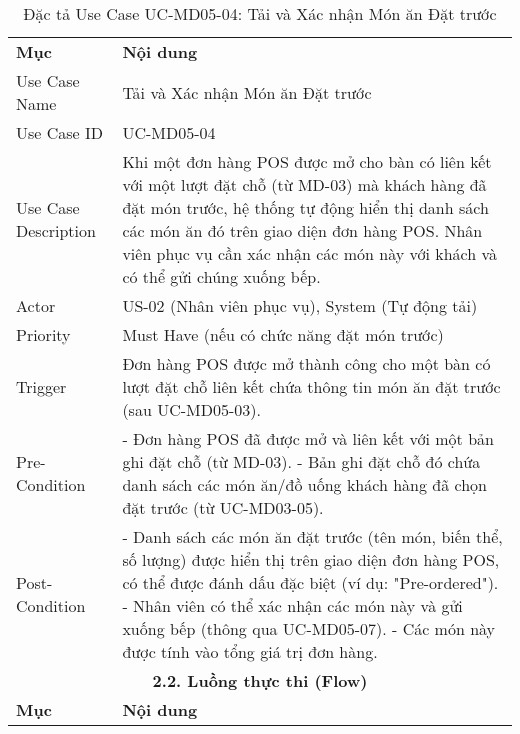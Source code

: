 \begin{longtable}{|m{4cm}|p{11cm}|}
\caption{Đặc tả Use Case UC-MD05-04: Tải và Xác nhận Món ăn Đặt trước} \label{tab:uc_md05_04} \\
\hline

\endhead %
\hline
\endfoot %
\hline
\endlastfoot %
\multicolumn{2}{|c|}{\textbf{2.1. Tóm tắt (Summary)}} \\
\hline
\textbf{Mục} & \textbf{Nội dung} \\
\hline
Use Case Name & Tải và Xác nhận Món ăn Đặt trước \\
\hline
Use Case ID & UC-MD05-04 \\
\hline
Use Case Description & Khi một đơn hàng POS được mở cho bàn có liên kết với một lượt đặt chỗ (từ MD-03) mà khách hàng đã đặt món trước, hệ thống tự động hiển thị danh sách các món ăn đó trên giao diện đơn hàng POS. Nhân viên phục vụ cần xác nhận các món này với khách và có thể gửi chúng xuống bếp. \\
\hline
Actor & US-02 (Nhân viên phục vụ), System (Tự động tải) \\
\hline
Priority & Must Have (nếu có chức năng đặt món trước) \\
\hline
Trigger & Đơn hàng POS được mở thành công cho một bàn có lượt đặt chỗ liên kết chứa thông tin món ăn đặt trước (sau UC-MD05-03). \\
\hline
Pre-Condition & - Đơn hàng POS đã được mở và liên kết với một bản ghi đặt chỗ (từ MD-03). \newline - Bản ghi đặt chỗ đó chứa danh sách các món ăn/đồ uống khách hàng đã chọn đặt trước (từ UC-MD03-05). \\
\hline
Post-Condition & - Danh sách các món ăn đặt trước (tên món, biến thể, số lượng) được hiển thị trên giao diện đơn hàng POS, có thể được đánh dấu đặc biệt (ví dụ: "Pre-ordered"). \newline - Nhân viên có thể xác nhận các món này và gửi xuống bếp (thông qua UC-MD05-07). \newline - Các món này được tính vào tổng giá trị đơn hàng. \\
\hline
\multicolumn{2}{|c|}{\textbf{2.2. Luồng thực thi (Flow)}} \\
\hline
\textbf{Mục} & \textbf{Nội dung} \\
\hline

\end{longtable}
